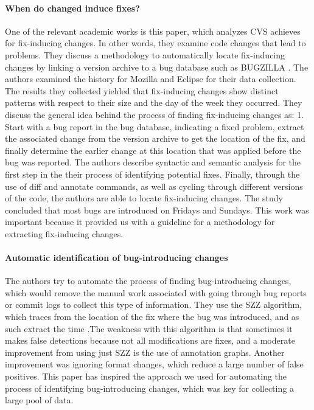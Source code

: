\documentclass[preprint, 11pt]{sigplanconf}
\begin{document}
\paragraph{When do changed induce fixes?}
One of the relevant academic works is this paper, which analyzes CVS
achieves for fix-inducing changes. In other words, they examine code
changes that lead to problems. They discuss a methodology to
automatically locate fix-inducing changes by linking a version archive
to a bug database such as BUGZILLA \cite{2005-changes}. The authors
examined the history for Mozilla and Eclipse for their data
collection. The results they collected yielded that fix-inducing
changes show distinct patterns with respect to their size and the day
of the week they occurred. They discuss the general idea behind the
process of finding fix-inducing changes as: 1. Start with a bug report
in the bug database, indicating a fixed problem, extract the
associated change from the version archive to get the location of the
fix, and finally determine the earlier change at this location that
was applied before the bug was reported. The authors describe
syntactic and semantic analysis for the first step in the their
process of identifying potential fixes. Finally, through the use of
diff and annotate commands, as well as cycling through different
versions of the code, the authors are able to locate fix-inducing
changes. The study concluded that most bugs are introduced on Fridays
and Sundays. This work was important because it provided us with a
guideline for a methodology for extracting fix-inducing changes.

\paragraph{Automatic identification of bug-introducing changes}
The authors try to automate the process of finding bug-introducing
changes, which would remove the manual work associated with going
through bug reports or commit logs to collect this type of
information. They use the SZZ algorithm, which traces from the
location of the fix where the bug was introduced, and as such extract
the time \cite{2006-automatic}.The weakness with this algorithm is
that sometimes it makes false detections because not all modifications
are fixes, and a moderate improvement from using just SZZ is the use
of annotation graphs. Another improvement was ignoring format changes,
which reduce a large number of false positives. This paper has
inspired the approach we used for automating the process of
identifying bug-introducing changes, which was key for collecting a
large pool of data.
\end{document}
